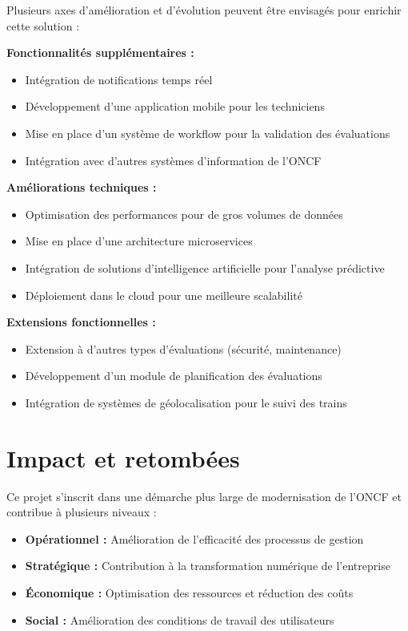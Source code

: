 Plusieurs axes d'amélioration et d'évolution peuvent être envisagés pour enrichir cette solution :

\textbf{Fonctionnalités supplémentaires :}
\begin{itemize}
    \item Intégration de notifications temps réel
    \item Développement d'une application mobile pour les techniciens
    \item Mise en place d'un système de workflow pour la validation des évaluations
    \item Intégration avec d'autres systèmes d'information de l'ONCF
\end{itemize}

\textbf{Améliorations techniques :}
\begin{itemize}
    \item Optimisation des performances pour de gros volumes de données
    \item Mise en place d'une architecture microservices
    \item Intégration de solutions d'intelligence artificielle pour l'analyse prédictive
    \item Déploiement dans le cloud pour une meilleure scalabilité
\end{itemize}

\textbf{Extensions fonctionnelles :}
\begin{itemize}
    \item Extension à d'autres types d'évaluations (sécurité, maintenance)
    \item Développement d'un module de planification des évaluations
    \item Intégration de systèmes de géolocalisation pour le suivi des trains
\end{itemize}

\section*{Impact et retombées}

Ce projet s'inscrit dans une démarche plus large de modernisation de l'ONCF et contribue à plusieurs niveaux :
\begin{itemize}
    \item \textbf{Opérationnel :} Amélioration de l'efficacité des processus de gestion
    \item \textbf{Stratégique :} Contribution à la transformation numérique de l'entreprise
    \item \textbf{Économique :} Optimisation des ressources et réduction des coûts
    \item \textbf{Social :} Amélioration des conditions de travail des utilisateurs
\end{itemize}

